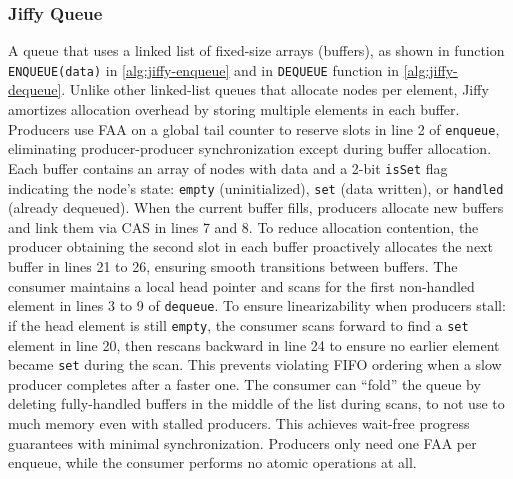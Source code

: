 \subsubsection{Jiffy Queue}\label{subsubsec:jiffy-mpsc-queue}
A queue that uses a linked list of fixed-size arrays (buffers), as shown in function \newline \texttt{ENQUEUE(data)} in \cref{alg:jiffy-enqueue} and in \texttt{DEQUEUE} function in \cref{alg:jiffy-dequeue}. Unlike other linked-list queues that allocate nodes per element, Jiffy amortizes allocation overhead by storing multiple elements in each buffer. Producers use \ac{FAA} on a global tail counter to reserve slots in line 2 of \texttt{enqueue}, eliminating producer-producer synchronization except during buffer allocation. Each buffer contains an array of nodes with data and a 2-bit \texttt{isSet} flag indicating the node's state: \texttt{empty} (uninitialized), \texttt{set} (data written), or \texttt{handled} (already dequeued). When the current buffer fills, producers allocate new buffers and link them via \ac{CAS} in lines 7 and 8. To reduce allocation contention, the producer obtaining the second slot in each buffer proactively allocates the next buffer in lines 21 to 26, ensuring smooth transitions between buffers. The consumer maintains a local head pointer and scans for the first non-handled element in lines 3 to 9 of \texttt{dequeue}. To ensure linearizability when producers stall: if the head element is still \texttt{empty}, the consumer scans forward to find a \texttt{set} element in line 20, then rescans backward in line 24 to ensure no earlier element became \texttt{set} during the scan. This prevents violating FIFO ordering when a slow producer completes after a faster one. The consumer can ``fold'' the queue by deleting fully-handled buffers in the middle of the list during scans, to not use to much memory even with stalled producers. This achieves wait-free progress guarantees with minimal synchronization. Producers only need one \ac{FAA} per enqueue, while the consumer performs no atomic operations at all. \cite{jiffy}

